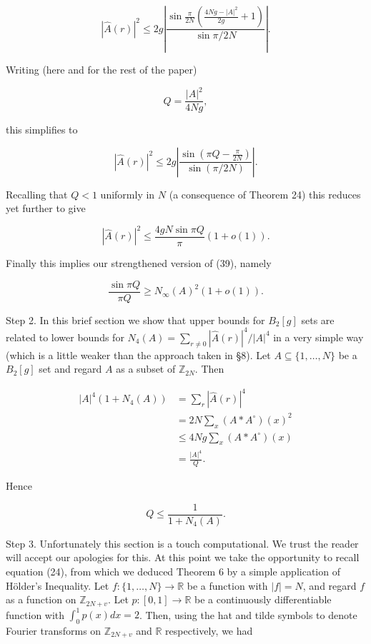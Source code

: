 \documentclass[10pt]{article}
\begin{document}
$$
|\hat{A}(r)|^{2} \leq 2 g\left|\frac{\sin \frac{\pi}{2 N}\left(\frac{4 N g-|A|^{2}}{2 g}+1\right)}{\sin \pi / 2 N}\right| .
$$

Writing (here and for the rest of the paper)

$$
Q=\frac{|A|^{2}}{4 N g},
$$

this simplifies to

$$
|\hat{A}(r)|^{2} \leq 2 g\left|\frac{\sin \left(\pi Q-\frac{\pi}{2 N}\right)}{\sin (\pi / 2 N)}\right| .
$$

Recalling that $Q<1$ uniformly in $N$ (a consequence of Theorem 24) this reduces yet further to give

$$
|\hat{A}(r)|^{2} \leq \frac{4 g N \sin \pi Q}{\pi}(1+o(1)) .
$$

Finally this implies our strengthened version of (39), namely


\begin{equation*}
\frac{\sin \pi Q}{\pi Q} \geq N_{\infty}(A)^{2}(1+o(1)) . \tag{40}
\end{equation*}


Step 2. In this brief section we show that upper bounds for $B_{2}[g]$ sets are related to lower bounds for $N_{4}(A)=\sum_{r \neq 0}|\hat{A}(r)|^{4} /|A|^{4}$ in a very simple way (which is a little weaker than the approach taken in §8). Let $A \subseteq\{1, \ldots, N\}$ be a $B_{2}[g]$ set and regard $A$ as a subset of $\mathbb{Z}_{2 N}$. Then

$$
\begin{aligned}
|A|^{4}\left(1+N_{4}(A)\right) & =\sum_{r}|\hat{A}(r)|^{4} \\
& =2 N \sum_{x}\left(A * A^{\circ}\right)(x)^{2} \\
& \leq 4 N g \sum_{x}\left(A * A^{\circ}\right)(x) \\
& =\frac{|A|^{4}}{Q} .
\end{aligned}
$$

Hence


\begin{equation*}
Q \leq \frac{1}{1+N_{4}(A)} . \tag{41}
\end{equation*}


Step 3. Unfortunately this section is a touch computational. We trust the reader will accept our apologies for this. At this point we take the opportunity to recall equation (24), from which we deduced Theorem 6 by a simple application of Hölder's Inequality. Let $f:\{1, \ldots, N\} \rightarrow \mathbb{R}$ be a function with $|f|=N$, and regard $f$ as a function on $\mathbb{Z}_{2 N+v}$. Let $p:[0,1] \rightarrow \mathbb{R}$ be a continuously differentiable function with $\int_{0}^{1} p(x) d x=2$. Then, using the hat and tilde symbols to denote Fourier transforms on $\mathbb{Z}_{2 N+v}$ and $\mathbb{R}$ respectively, we had
\end{document}
